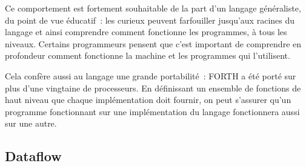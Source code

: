 \documentclass{article}
\begin{document}
Ce comportement est fortement souhaitable de la part d'un langage généraliste, du point de vue éducatif~: les curieux peuvent farfouiller
jusqu'aux racines du langage et ainsi comprendre comment fonctionne les programmes, à tous les niveaux. Certains programmeurs pensent que
c'est important de comprendre en profondeur comment fonctionne la machine et les programmes qui l'utilisent\cite{coders-at-work}.

Cela confère aussi au langage une grande portabilité~: FORTH a été porté sur plus d'une vingtaine de processeurs\cite{forth-history}. En définissant un ensemble
de fonctions de haut niveau que chaque implémentation doit fournir, on peut s'assurer qu'un programme fonctionnant sur une implémentation du
langage fonctionnera aussi sur une autre.

\subsection{Dataflow}
\end{document}
